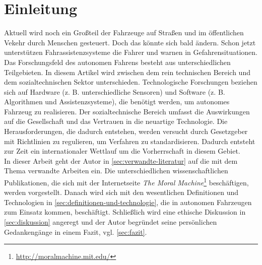 \section{Einleitung}

Aktuell wird noch ein Großteil der Fahrzeuge auf Straßen und im öffentlichen Vekehr durch Menschen gesteuert. Doch das könnte sich bald ändern. Schon jetzt unterstützen Fahrassistenzsysteme die Fahrer und warnen in Gefahrensituationen.\\

Das Forschungsfeld des autonomen Fahrens besteht aus unterschiedlichen Teilgebieten. In diesem Artikel wird zwischen dem rein technischen Bereich und dem sozialtechnischen Sektor unterschieden. Technologische Forschungen beziehen sich auf Hardware (z. B. unterschiedliche Sensoren) und Software (z. B. Algorithmen und Assistenzsysteme), die benötigt werden, um autonomes Fahrzeug zu realisieren. Der sozialtechnische Bereich umfasst die Auswirkungen auf die Gesellschaft und das Vertrauen in die neuartige Technologie. Die Herausforderungen, die dadurch entstehen, werden versucht durch Gesetzgeber mit Richtlinien zu regulieren, um Verfahren zu standardisieren. Dadurch entsteht zur Zeit ein internationaler Wettlauf um die Vorherrschaft in diesem Gebiet.\\

In dieser Arbeit geht der Autor in \ref{sec:verwandte-literatur} auf die mit dem Thema verwandte Arbeiten ein. Die unterschiedlichen wissenschaftlichen Publikationen, die sich mit der Internetseite \textit{The Moral Machine}\footnote{\url{http://moralmachine.mit.edu/}} beschäftigen, werden vorgestellt. Danach wird sich mit den wesentlichen Definitionen und Technologien in \ref{sec:definitionen-und-technologie}, die in autonomen Fahrzeugen zum Einsatz kommen, beschäftigt. Schließlich wird eine ethische Diskussion in \ref{sec:diskussion} angeregt und der Autor begründet seine persönlichen Gedankengänge in einem Fazit, vgl. \ref{sec:fazit}.